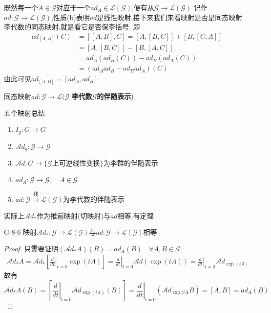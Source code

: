\documentclass[../main.tex]{subfiles}
\begin{document}
既然每一个$A \in \mathscr{G}$对应于一个$ad_A \in \mathscr{L}(\mathscr{G})$,便有从$\mathscr{G} \rightarrow \mathscr{L}(\mathscr{G})$
记作$ad : \mathscr{G}\rightarrow \mathscr{L}(\mathscr{G})$,性质(b)表明$ad$是线性映射,接下来我们来看映射是否是同态映射
李代数的同态映射,就是看它是否保李括号.
即\begin{align*}
	ad_{[A,B]}(C) & = [[A,B],C] = [A,[B,C]] + [B,[C,A]] \\
	              & = [A,[B,C]] -[B,[A,C]]              \\
	              & = ad_A(ad_B(C)) - ad_B(ad_A(C))     \\
	              & = (ad_A ad_B - ad_B ad_A)(C)
\end{align*}
由此可见$ad_{[A,B]} = [ad_A,ad_B]$
\begin{definition}
	同态映射$ad:\mathscr{G} \rightarrow \mathscr{L}(\mathscr{G}$ \textbf{李代数$\mathscr{G}$的伴随表示})
\end{definition}
五个映射总结\begin{enumerate}
	\item $I_g:G\rightarrow G$
	\item $\mathscr{A}\!d_g: \mathscr{G} \rightarrow \mathscr{G}$
	\item $\mathscr{A}\!d :G \rightarrow \{ \mathscr{G}\text{上可逆线性变换}\}$为李群的伴随表示
	\item $ad_A:\mathscr{G}\rightarrow \mathscr{G},\quad A\in \mathscr{G}$
	\item $ad : \mathscr{G} \xrightarrow{\text{线}} \mathscr{L}(\mathscr{G})$为李代数的伴随表示
\end{enumerate}
实际上$\mathscr{A}\!d_*$作为推前映射(切映射)与$ad$相等,有定理
\begin{theorem}{}{G-8-6}
	映射$\mathscr{A}\!d_{*}: \mathscr{G} \rightarrow \mathscr{L}(\mathscr{G})$与$ad:\mathscr{G}\rightarrow \mathscr{L}(\mathscr{G})$相等
\end{theorem}
\begin{proof}
	只需要证明$(\mathscr{A}\!d_*A)(B) = ad_A(B)\quad \forall A,B \in \mathscr{G}$
	\begin{align*}
		\mathscr{A}\!d_* A = \mathscr{A}\!d_* [\left.\frac{d}{dt}\right|_{t=0}\exp(tA)] =   \left.\frac{d}{dt}\right|_{t=0}\mathscr{A}\!d(\exp (tA)) = \left.\frac{d}{dt}\right|_{t=0} \mathscr{A}\!d_{\exp(tA)}
	\end{align*}
	故有$$
		\mathscr{A}\!d_*A(B) = [\left.\frac{d}{dt}\right|_{t=0} \mathscr{A}\!d_{\exp(tA)}(B)] = \left.\frac{d}{dt}\right|_{t=0}(\mathscr{A}\!d_{\exp(tA}B) = [A,B] = ad_A(B)$$

\end{proof}
\end{document}
